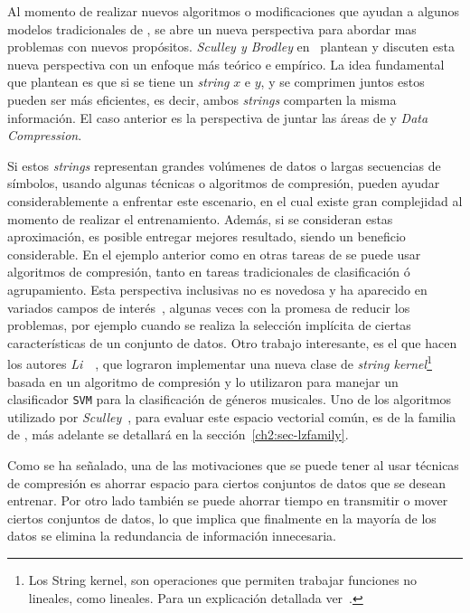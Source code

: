 Al momento de realizar nuevos algoritmos o modificaciones que ayudan a algunos modelos tradicionales de \machinelearning, se abre un nueva perspectiva para abordar mas problemas con nuevos propósitos. \emph{Sculley y Brodley} en~\cite{Sculley2006} plantean y discuten esta nueva perspectiva con un enfoque más teórico e empírico. La idea fundamental que plantean es que si se tiene un \emph{string} $x$ e $y$, y  se comprimen juntos estos pueden ser más eficientes, es decir,  ambos \emph{strings} comparten la misma información. El caso anterior es la perspectiva de juntar las áreas de \machinelearning y \emph{Data Compression}. 

Si estos \emph{strings} representan grandes volúmenes de datos o largas secuencias de símbolos, usando algunas técnicas o algoritmos de compresión, pueden ayudar considerablemente a enfrentar este escenario, en el cual existe gran complejidad al momento de realizar el entrenamiento. Además, si se consideran estas aproximación, es posible entregar mejores resultado, siendo un beneficio considerable. En el ejemplo anterior como en otras tareas de \machinelearning se puede usar algoritmos de compresión, tanto en tareas tradicionales de clasificación ó agrupamiento.  Esta perspectiva inclusivas no es novedosa y ha aparecido en variados campos de interés~\cite{Sculley2006}, algunas veces con la promesa de reducir los problemas, por ejemplo cuando se realiza la selección implícita de ciertas características de un conjunto de datos. Otro trabajo interesante, es el que hacen los autores  \emph{Li}~\etal~\cite{Li2005}, que lograron implementar una nueva clase de \emph{string kernel}\footnote{Los String kernel, son operaciones que permiten trabajar funciones no lineales, como lineales. Para un explicación detallada ver~\cite{Li2005}.} basada en un algoritmo de compresión y lo utilizaron para manejar un clasificador \texttt{SVM} para la clasificación de géneros musicales. Uno de los algoritmos utilizado por \emph{Sculley}~\cite{Sculley2006}, para evaluar este espacio vectorial común, es de la familia de \lempelziv, más adelante se detallará en la  sección~\ref{ch2:sec-lzfamily}.

Como se ha señalado, una de las motivaciones que se puede tener al usar técnicas de compresión es ahorrar espacio para ciertos conjuntos de datos que se desean entrenar. Por otro lado también se puede ahorrar tiempo en transmitir o mover ciertos conjuntos de datos, lo que implica que finalmente en la mayoría de los datos se elimina la redundancia de información innecesaria.

